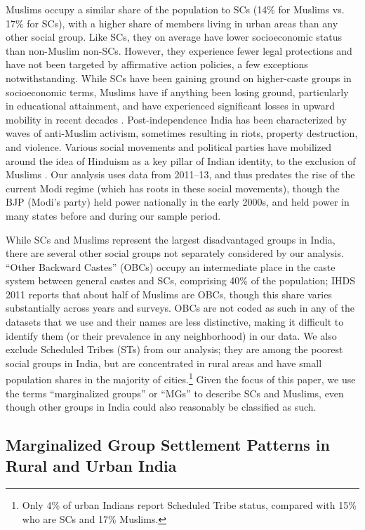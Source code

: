 \documentclass[12pt]{article}
\begin{document}
Muslims occupy a similar share of the population to SCs (14\% for Muslims vs. 17\% for SCs), with a higher share of members living in urban areas than any other social group. Like SCs, they on average have lower socioeconomic status than non-Muslim non-SCs. However, they experience fewer legal protections and have not been targeted by affirmative action policies, a few exceptions notwithstanding. While SCs have been gaining ground on higher-caste groups in socioeconomic terms, Muslims have if anything been losing ground, particularly in educational attainment, and have experienced significant losses in upward mobility in recent decades \citep{anr2022mob}. Post-independence India has been characterized by waves of anti-Muslim activism, sometimes resulting in riots, property destruction, and violence. Various social movements and political parties have mobilized around the idea of Hinduism as a key pillar of Indian identity, to the exclusion of Muslims \citep{jaffrelot2021modi}. Our analysis uses data from 2011--13, and thus predates the rise of the current Modi regime (which has roots in these social movements), though the BJP (Modi's party) held power nationally in the early 2000s, and held power in many states before and during our sample period.

While SCs and Muslims represent the largest disadvantaged groups in India, there are several other social groups not separately considered by our analysis. ``Other Backward Castes'' (OBCs) occupy an intermediate place in the caste system between general castes and SCs, comprising 40\% of the population; IHDS 2011 reports that about half of Muslims are OBCs, though this share varies substantially across years and surveys. OBCs are not coded as such in any of the datasets that we use and their names are less distinctive, making it difficult to identify them (or their prevalence in any neighborhood) in our data. We also exclude Scheduled Tribes (STs) from our analysis; they are among the poorest social groups in India, but are concentrated in rural areas and have small population shares in the majority of cities.\footnote{Only 4\% of urban Indians report Scheduled Tribe status, compared with 15\% who are SCs and 17\% Muslims.} Given the focus of this paper, we use the terms ``marginalized groups'' or ``MGs'' to describe SCs and Muslims, even though other groups in India could also reasonably be classified as such.

\subsection{Marginalized Group Settlement Patterns in Rural and Urban India}
\end{document}
